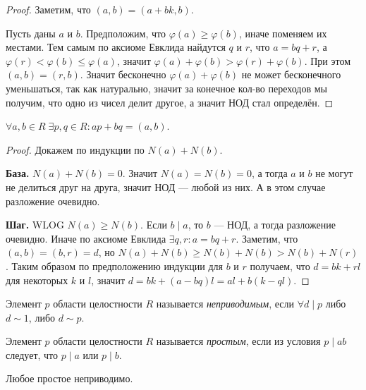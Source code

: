 \documentclass[12pt,a4paper]{article}
\begin{document}
    \begin{proof}
        Заметим, что $(a, b) = (a + bk, b)$.
        
        Пусть даны $a$ и $b$. Предположим, что $\varphi(a) \geqslant \varphi(b)$, иначе поменяем их местами. Тем самым по аксиоме Евклида найдутся $q$ и $r$, что $a = bq + r$, а $\varphi(r) < \varphi(b) \leqslant \varphi(a)$, значит $\varphi(a) + \varphi(b) > \varphi(r) + \varphi(b)$. При этом $(a, b) = (r, b)$. Значит бесконечно $\varphi(a) + \varphi(b)$ не может бесконечного уменьшаться, так как натурально, значит за конечное кол-во переходов мы получим, что одно из чисел делит другое, а значит НОД стал определён.
    \end{proof}

    \begin{theorem}
        $\forall a, b \in R\; \exists p, q \in R: ap + bq = (a, b)$.
    \end{theorem}

    \begin{proof}
        Докажем по индукции по $N(a) + N(b)$.

        \textbf{База.} $N(a) + N(b)=0$. Значит $N(a)=N(b)=0$, а тогда $a$ и $b$ не могут не делиться друг на друга, значит НОД --- любой из них. А в этом случае разложение очевидно.
        
        \textbf{Шаг.} WLOG $N(a) \geqslant N(b)$. Если $b \mid a$, то $b$ --- НОД, а тогда разложение очевидно. Иначе по аксиоме Евклида $\exists q, r: a = bq + r$. Заметим, что $(a, b) = (b, r) = d$, но $N(a) + N(b) \geqslant N(b) + N(b) > N(b) + N(r)$. Таким образом по предположению индукции для $b$ и $r$ получаем, что $d = bk + rl$ для некоторых $k$ и $l$, значит $d = bk + (a - bq)l = al + b(k - ql)$.
    \end{proof}

    \begin{definition}
        Элемент $p$ области целостности $R$ называется \emph{неприводимым}, если $\forall d \mid p$ либо $d \sim 1$, либо $d \sim p$.
    \end{definition}
    
    \begin{definition}
        Элемент $p$ области целостности $R$ называется \emph{простым}, если из условия $p \mid ab$ следует, что $p \mid a$ или $p \mid b$.
    \end{definition}

    \begin{statement}
        Любое простое неприводимо.
    \end{statement}
\end{document}
